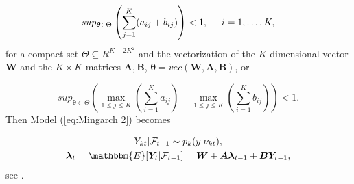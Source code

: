 \begin{equation}
sup_{\bm{\theta} \in \Theta} \left(\sum_{j=1}^K(a_{ij}+b_{ij})\right) < 1, \hspace{0.5cm} i=1,\ldots,K , 
\label{eq:Mingarch 2 function condition 1}
\end{equation}
%
for a compact set $\Theta \subseteq R^{K+ 2K^2}$ and the vectorization of the $K$-dimensional vector $\bm{W}$ and the $K\times K$ matrices $\bm{A},\bm{B}$, $\bm{\theta}=vec(\bm{W},\bm{A},\bm{B})$, or 

\begin{equation}
sup_{\bm{\theta} \in \Theta}\left(\max_{1\leq j \leq K}(\sum_{i=1}^K a_{ij}) + \max_{1\leq j \leq K} \left(\sum_{i=1}^K b_{ij}\right)\right) < 1.
\label{eq:Mingarch 2 function condition 2}
\end{equation}
%
Then Model (\ref{eq:Mingarch 2}) becomes 

\begin{equation}
\begin{gathered}
Y_{kt} | \SigA_{t-1} \sim p_k(y|\nu_{kt}), \\
\bm{\lambda}_t = \mathbbm{E}[\bm{Y}_t | \SigA_{t-1}] = \bm{W} + \bm{A}\bm{\lambda}_{t-1} + \bm{B}\bm{Y}_{t-1},
\label{eq:Mingarch 2 linear}
\end{gathered}
\end{equation}
%
see \textcite{Lee:2023}. 
